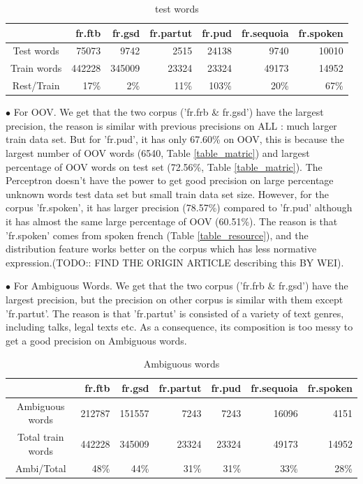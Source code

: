 \documentclass{article}
\begin{document}
\begin{table}[h]
\caption{test words}
\vspace{5pt}
\centering
\begin{tabular}{|c|r|r|r|r|r|r|}
\hline
\ & fr.ftb & fr.gsd & fr.partut & fr.pud & fr.sequoia & fr.spoken \\
\hline
Test words & 75073 & 9742 & 2515 & 24138 & 9740 & 10010 \\
\hline
Train words & 442228 & 345009 & 23324 & 23324 & 49173 & 14952 \\
\hline
Rest/Train & 17\% & 2\% & 11\% & 103\% & 20\% & 67\%\\  
\hline
\end{tabular}
\label{test_on_train}
\end{table}


$\bullet$ For OOV. We get that the two corpus ('fr.frb \& fr.gsd') have the largest precision, the reason is similar with previous precisions on ALL : much larger train data set. But for 'fr.pud', it has only 67.60\% on OOV, this is because the largest number of OOV words (6540, Table \ref{table_matric}) and largest percentage of OOV words on test set (72.56\%, Table  \ref{table_matric}). The Perceptron doesn't have the power to get good precision on large percentage unknown words test data set but small train data set size. However, for the corpus 'fr.spoken', it has larger precision (78.57\%) compared to 'fr.pud' although it has almost the same large percentage of OOV (60.51\%). The reason is that 'fr.spoken' comes from spoken french (Table \ref{table_resource}), and the distribution feature works better on the corpus which has less normative expression.(TODO:: FIND THE ORIGIN ARTICLE describing this BY WEI). 

$\bullet$ For Ambiguous Words. We get that the two corpus ('fr.frb \& fr.gsd') have the largest precision, but the precision on other corpus is similar with them except 'fr.partut'. The reason is that 'fr.partut' is consisted of a variety of text genres, including talks, legal texts etc. As a consequence, its composition is too messy to get a good precision on Ambiguous words.



\begin{table}[h]
\caption{Ambiguous words}
\vspace{5pt}
\centering
\begin{tabular}{|c|r|r|r|r|r|r|}
\hline
\ & fr.ftb & fr.gsd & fr.partut & fr.pud & fr.sequoia & fr.spoken \\
\hline
Ambiguous words & 212787 & 151557 & 7243 & 7243 & 16096 & 4151 \\
\hline
Total train words & 442228 & 345009 & 23324 & 23324 & 49173 & 14952 \\
\hline
Ambi/Total & 48\% & 44\% & 31\% & 31\% & 33\% & 28\%\\  
\hline
\end{tabular}
\end{table}
\end{document}

